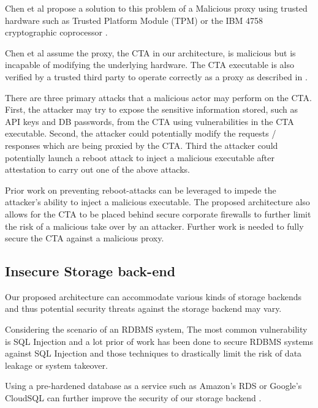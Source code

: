 \documentclass[a4paper,twoside]{article}
\begin{document}
Chen et al \cite{chen_towards_2012} propose a solution to this problem of a Malicious proxy using trusted hardware such as Trusted Platform Module (TPM) or the IBM 4758 cryptographic coprocessor \cite{parno_bootstrapping_2010}. 

Chen et al assume the proxy, the CTA in our architecture, is malicious but is incapable of modifying the underlying hardware. The CTA executable is also verified by a trusted third party to operate correctly as a proxy as described in \cite{parno_bootstrapping_2010}.

There are three primary attacks that a malicious actor may perform on the CTA. First, the attacker may try to expose the sensitive information stored, such as API keys and DB passwords, from the CTA using vulnerabilities in the CTA executable. Second, the attacker could potentially modify the requests / responses which are being proxied by the CTA. Third the attacker could potentially launch a reboot attack to inject a malicious executable after attestation to carry out one of the above attacks.

Prior work \cite{libert_tracing_2008, mccune_flicker:_2008} on preventing reboot-attacks can be leveraged to impede the attacker's ability to inject a malicious executable. The proposed architecture also allows for the CTA to be placed behind secure corporate firewalls to further limit the risk of a malicious take over by an attacker. Further work is needed to fully secure the CTA against a malicious proxy.

\subsection{Insecure Storage back-end}

Our proposed architecture can accommodate various kinds of storage backends and thus potential security threats against the storage backend may vary. 

Considering the scenario of an RDBMS system, The most common vulnerability is SQL Injection and a lot prior of work has been done to secure RDBMS systems against SQL Injection \cite{halfond_amnesia:_2005, boyd_sqlrand:_2004, halfond_classification_2006} and those techniques to drastically limit the risk of data leakage or system takeover.

Using a pre-hardened database as a service such as Amazon's RDS or Google's CloudSQL can further improve the security of our storage backend \cite{curino_relational_2011} .
\end{document}
